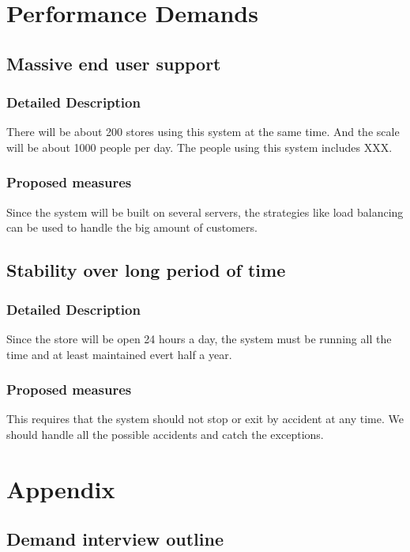 \documentclass[a4paper]{report}
\begin{document}
\chapter{Performance Demands}

\section{Massive end user support}
\subsection{Detailed Description}
There will be about 200 stores using this system at the same time. And the scale will be about 1000 people per day. The people using this system includes XXX.
\subsection{Proposed measures}
Since the system will be built on several servers, the strategies like load balancing can be used to handle the big amount of customers.

\section{Stability over long period of time}
\subsection{Detailed Description}
Since the store will be open 24 hours a day, the system must be running all the time and at least maintained evert half a year.
\subsection{Proposed measures}
This requires that the system should not stop or exit by accident at any time. We should handle all the possible accidents and catch the exceptions.

\chapter{Appendix}
\section{Demand interview outline}
\end{document}
